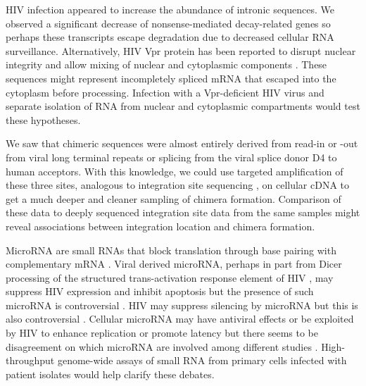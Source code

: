 \documentclass[../sherrill-Mix_thesis.tex]{subfiles}
\begin{document}
	HIV infection appeared to increase the abundance of intronic sequences. We observed a significant decrease of nonsense-mediated decay-related genes so perhaps these transcripts escape degradation due to decreased cellular RNA surveillance.  Alternatively, HIV Vpr protein has been reported to disrupt nuclear integrity and allow mixing of nuclear and cytoplasmic components \citep{Noronha2001}. These sequences might represent incompletely spliced mRNA that escaped into the cytoplasm before processing. Infection with a Vpr-deficient HIV virus and separate isolation of RNA from nuclear and cytoplasmic compartments \citep{Wilkinson1988,Trask2009,Solnestam2012} would test these hypotheses.

	We saw that chimeric sequences were almost entirely derived from read-in or -out from viral long terminal repeats or splicing from the viral splice donor D4 to human acceptors. With this knowledge, we could use targeted amplification of these three sites, analogous to integration site sequencing \citep{Schroder2002,Wang2007,Berry2014}, on cellular cDNA to get a much deeper and cleaner sampling of chimera formation. Comparison of these data to deeply sequenced integration site data from the same samples might reveal associations between integration location and chimera formation.

	MicroRNA are small RNAs that block translation through base pairing with complementary mRNA \citep{Lagos-Quintana2001, Ambros2004,Landgraf2007}.  Viral derived microRNA, perhaps in part from Dicer processing of the structured trans-activation response element of HIV \citep{Klase2007,Ouellet2008,Schopman2012,Klase2009}, may suppress HIV expression \citep{Omoto2004,Triboulet2007,Chable-Bessia2009} and inhibit apoptosis \citep{Klase2009} but the presence of such microRNA is controversial \citep{Pfeffer2005,Lin2007}. HIV may suppress silencing by microRNA \citep{Bennasser2005,Triboulet2007,Qian2009} but this is also controversial \citep{Lin2007}. Cellular microRNA may have antiviral effects \citep{Sung2009,Swaminathan2012} or be exploited by HIV to enhance replication \citep{Zhang2012a,Zhang2012,Chiang2013,Orecchini2014,Farberov2015} or promote latency \citep{Huang2007,Chiang2012} but there seems to be disagreement on which microRNA are involved among different studies \citep{Chiang2012a}. High-throughput genome-wide assays of small RNA \citep{Lefebvre2011,Chang2013} from primary cells infected with patient isolates would help clarify these debates.

	
\end{document}
